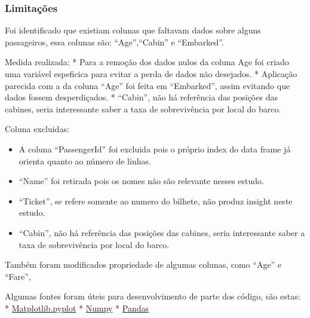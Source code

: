 \documentclass[11pt]{article}
\providecommand{\tightlist}{%
      \setlength{\itemsep}{0pt}\setlength{\parskip}{0pt}}
\begin{document}
\hypertarget{limitauxe7uxf5es}{%
\subsubsection{Limitações}\label{limitauxe7uxf5es}}

Foi identificado que existiam colunas que faltavam dados sobre alguns
passageiros, essa colunas são: ``Age'',``Cabin'' e ``Embarked''.

Medida realizada: * Para a remoção dos dados nulos da coluna Age foi
criado uma variável espeficica para evitar a perda de dados não
desejados. * Aplicação parecida com a da coluna ``Age'' foi feita em
``Embarked'', assim evitando que dados fossem desperdiçados. *
``Cabin'', não há referência das posições das cabines, seria
interessante saber a taxa de sobrevivência por local do barco.

Coluna excluidas:

\begin{itemize}
\tightlist
\item
  A coluna ``PassengerId'' foi excluida pois o próprio index do data
  frame já orienta quanto ao número de linhas.
\item
  ``Name'' foi retirada pois os nomes não são relevante nesses estudo.
\item
  ``Ticket'', se refere somente ao numero do bilhete, não produz insight
  neste estudo.
\item
  ``Cabin'', não há referência das posições das cabines, seria
  interessante saber a taxa de sobrevivência por local do barco.
\end{itemize}

Também foram modificados propriedade de algumas colunas, como ``Age'' e
``Fare'',

Algumas fontes foram úteis para desenvolvimento de parte dos código, são
estas: *
\href{https://matplotlib.org/api/_as_gen/matplotlib.pyplot.pie.html\#matplotlib.pyplot.pie}{Matplotlib.pyplot}
* \href{https://docs.scipy.org/doc/numpy/user/basics.types.html}{Numpy}
*
\href{https://pandas.pydata.org/pandas-docs/stable/visualization.html}{Pandas}


    
    
    
    
\end{document}
